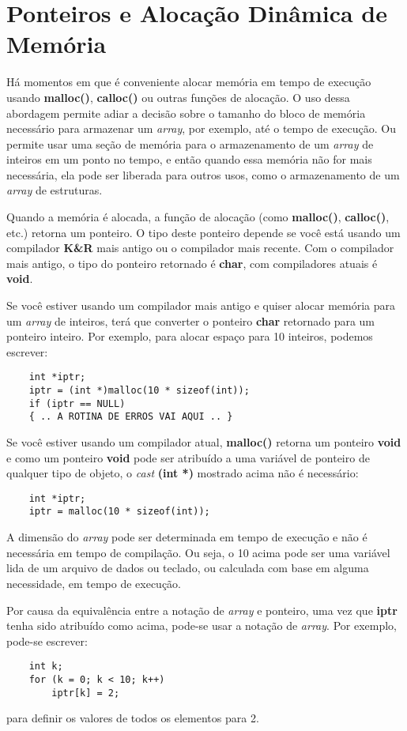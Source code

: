 
\chapter{Ponteiros e Alocação Dinâmica de Memória}
Há momentos em que é conveniente alocar memória em tempo de execução usando \textbf{malloc()}, \textbf{calloc()} ou outras funções de alocação. O uso dessa abordagem permite adiar a decisão sobre o tamanho do bloco de memória necessário para armazenar um \textit{array}, por exemplo, até o tempo de execução. Ou permite usar uma seção de memória para o armazenamento de um \textit{array} de inteiros em um ponto no tempo, e então quando essa memória não for mais necessária, ela pode ser liberada para outros usos, como o armazenamento de um \textit{array} de estruturas.

Quando a memória é alocada, a função de alocação (como \textbf{malloc()}, \textbf{calloc()}, etc.) retorna um ponteiro. O tipo deste ponteiro depende se você está usando um compilador \textbf{K\&R} mais antigo ou o compilador mais recente. Com o compilador mais antigo, o tipo do ponteiro retornado é \textbf{char}, com compiladores atuais é \textbf{void}.

Se você estiver usando um compilador mais antigo e quiser alocar memória para um \textit{array} de inteiros, terá que converter o ponteiro \textbf{char} retornado para um ponteiro inteiro. Por exemplo, para alocar espaço para 10 inteiros, podemos escrever:
\begin{lstlisting}
	int *iptr;
	iptr = (int *)malloc(10 * sizeof(int));
	if (iptr == NULL)
	{ .. A ROTINA DE ERROS VAI AQUI .. }
\end{lstlisting}

Se você estiver usando um compilador atual, \textbf{malloc()} retorna um ponteiro \textbf{void} e como um ponteiro \textbf{void} pode ser atribuído a uma variável de ponteiro de qualquer tipo de objeto, o \textit{cast} \textbf{(int *)} mostrado acima não é necessário: 
\begin{lstlisting}
	int *iptr;
	iptr = malloc(10 * sizeof(int));
\end{lstlisting}
A dimensão do \textit{array} pode ser determinada em tempo de execução e não é necessária em tempo de compilação. Ou seja, o 10 acima pode ser uma variável lida de um arquivo de dados ou teclado, ou calculada com base em alguma necessidade, em tempo de execução.

Por causa da equivalência entre a notação de \textit{array} e ponteiro, uma vez que \textbf{iptr} tenha sido atribuído como acima, pode-se usar a notação de \textit{array}. Por exemplo, pode-se escrever:
\begin{lstlisting}
	int k;
	for (k = 0; k < 10; k++)
		iptr[k] = 2;
\end{lstlisting}
para definir os valores de todos os elementos para 2.

